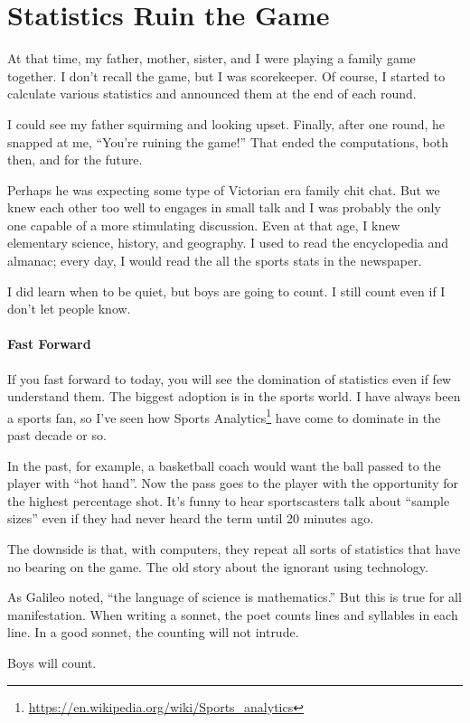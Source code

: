 \section{Statistics Ruin the Game}

At that time, my father, mother, sister, and I were playing a family game together. I don't recall the game, but I was scorekeeper. Of course, I started to calculate various statistics and announced them at the end of each round.

I could see my father squirming and looking upset. Finally, after one round, he snapped at me, ``You're ruining the game!'' That ended the computations, both then, and for the future.

Perhaps he was expecting some type of Victorian era family chit chat. But we knew each other too well to engages in small talk and I was probably the only one capable of a more stimulating discussion. Even at that age, I knew elementary science, history, and geography. I used to read the encyclopedia and almanac; every day, I would read the all the sports stats in the newspaper.

I did learn when to be quiet, but boys are going to count. I still count even if I don't let people know.

\paragraph{Fast Forward}


If you fast forward to today, you will see the domination of statistics even if few understand them. The biggest adoption is in the sports world. I have always been a sports fan, so I've seen how Sports Analytics\footnote{\url{https://en.wikipedia.org/wiki/Sports\_analytics}} have come to dominate in the past decade or so.

In the past, for example, a basketball coach would want the ball passed to the player with ``hot hand''. Now the pass goes to the player with the opportunity for the highest percentage shot. It's funny to hear sportscasters talk about ``sample sizes'' even if they had never heard the term until 20 minutes ago.

The downside is that, with computers, they repeat all sorts of statistics that have no bearing on the game. The old story about the ignorant using technology.

As Galileo noted, ``the language of science is mathematics.'' But this is true for all manifestation. When writing a sonnet, the poet counts lines and syllables in each line. In a good sonnet, the counting will not intrude.

Boys will count.



